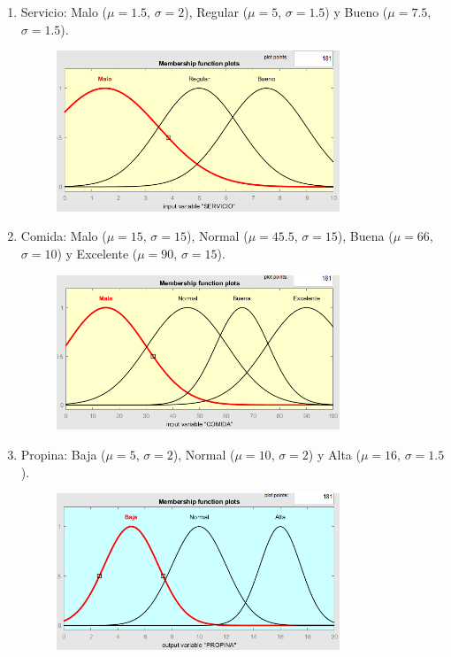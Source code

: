 \documentclass[11pt, letterpaper]{article}
\begin{document}
\begin{enumerate}
	\item Servicio: Malo ($\mu = 1.5$, $\sigma = 2$), Regular ($\mu = 5$, $\sigma = 1.5$) y Bueno ($\mu = 7.5$, $\sigma = 1.5$).
	\begin{figure}[h]
		\centering
		\includegraphics[width=0.8\textwidth]{IMG/P11.png}
	\end{figure}
	
	\newpage
	
	\item Comida: Malo ($\mu = 15$, $\sigma = 15$), Normal ($\mu = 45.5$, $\sigma = 15$), Buena ($\mu = 66$, $\sigma = 10$) y Excelente ($\mu = 90$, $\sigma = 15$).
	\begin{figure}[h]
		\centering
		\includegraphics[width=0.8\textwidth]{IMG/P12.png}
	\end{figure}
	
	\item Propina: Baja ($\mu = 5$, $\sigma = 2$), Normal ($\mu = 10$, $\sigma = 2$) y Alta ($\mu = 16$, $\sigma = 1.5$).
	\begin{figure}[h]
		\centering
		\includegraphics[width=0.8\textwidth]{IMG/P13.png}
	\end{figure}
\end{enumerate}
\end{document}
